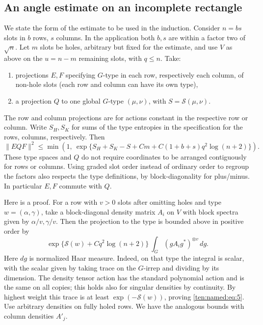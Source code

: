 \subsection{An angle estimate on an incomplete rectangle}
We state the form of the estimate to be used in the induction. Consider \(n=b s\) slots in \(b\) rows, \(s\) columns. In the application both \(b,s\) are within a factor two of \(\sqrt n\). Let \(m\) slots be holes, arbitrary but fixed for the estimate, and use \(V\) as above on the \(u=n-m\) remaining slots, with \(q\le n\). Take:
\begin{enumerate}
\item projections \(E,F\) specifying \(G\)-type in each row, respectively each column, of non-hole slots (each row and column can have its own type),
\item a projection \(Q\) to one global \(G\)-type \((\mu,\nu)\), with \(S=\mathcal S(\mu,\nu)\).
\end{enumerate}

The row and column projections are for actions constant in the respective row or column. Write \(S_H,S_K\) for sums of the type entropies in the specification for the rows, columns, respectively. Then
\begin{equation}
 \| E Q F\|^2
 \le
 \min\left(1,\
   \exp\{S_H+S_K-S+C m+C(1+b+s)q^2\log(n+2)\}
          \right).
 \label{ten:named:eq:4}
\end{equation}
These type spaces and \(Q\) do not require coordinates to be arranged contiguously for rows or columns. Using graded slot order instead of ordinary order to regroup the factors also respects the type definitions, by block-diagonality for plus/minus. In particular \(E,F\) commute with \(Q\).

Here is a proof. For a row with \(v>0\) slots after omitting holes and type \(w=(\alpha,\gamma)\), take a block-diagonal density matrix \(A_i\) on \(V\) with block spectra given by \(\alpha/v,\gamma/v\). Then the projection to the type is bounded above in positive order by
\begin{equation}
 \exp\{\mathcal S(w)+C q^2\log(n+2)\}\ 
   \int_G (g A_i g^*)^{\otimes v}\,dg.
 \label{ten:named:eq:5}
\end{equation}
Here \(dg\) is normalized Haar measure. Indeed, on that type the integral is scalar, with the scalar given by taking trace on the \(G\)-irrep and dividing by its dimension. The density tensor action has the standard polynomial action and is the same on all copies; this holds also for singular densities by continuity. By highest weight this trace is at least \(\exp(-\mathcal S(w))\), proving \eqref{ten:named:eq:5}. Use arbitrary densities on fully holed rows. We have the analogous bounds with column densities \(A'_j\).

